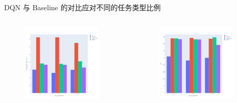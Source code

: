 \begin{frame}{DQN 与 Baseline 的对比}{应对不同的任务类型比例}

    \begin{columns}


        \begin{figure}
            \centering
            \includegraphics[width=0.9\textwidth]{pics/vary_job_resp.png}
        \end{figure}


        \begin{figure}
            \centering
            \includegraphics[width=0.9\textwidth]{pics/vary_job_cost.png}
        \end{figure}

    \end{columns}

\end{frame}

